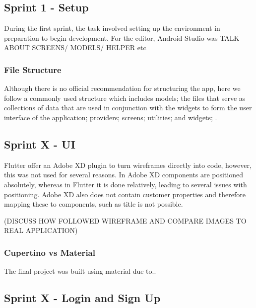 \documentclass[12pt]{article}
\begin{document}
	
	\subsection{Sprint 1 - Setup}
	During the first sprint, the task involved setting up the environment in preparation to begin development. For the editor, Android Studio was 
	TALK ABOUT SCREENS/ MODELS/ HELPER etc
	\subsubsection{File Structure}
	Although there is no official recommendation for structuring the app, here we follow a commonly used structure which includes models; the files that serve as collections of data that are used in conjunction with the widgets to form the user interface of the application; providers; screens; utilities; and widgets; .
	
	
	
	\subsection{Sprint X - UI}
	Flutter offer an Adobe XD plugin to turn wireframes directly into code, however, this was not used for several reasons. In Adobe XD components are positioned absolutely, whereas in Flutter it is done relatively, leading to several issues with positioning. Adobe XD also does not contain customer properties and therefore mapping these to components, such as title is not possible.
	
	(DISCUSS HOW FOLLOWED WIREFRAME AND COMPARE IMAGES TO REAL APPLICATION)
	
	\subsubsection{Cupertino vs Material}
	The final project was built using material due to..
	
	\subsection{Sprint X - Login and Sign Up}
	
\end{document}
